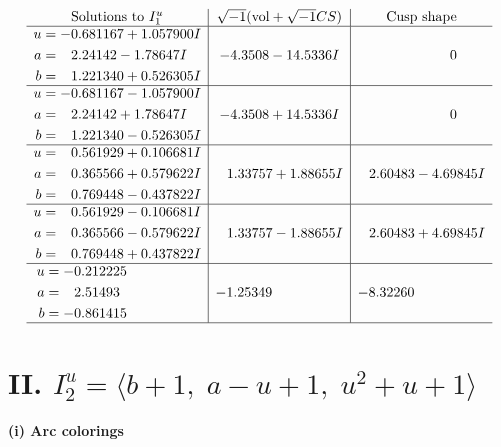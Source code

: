 \documentclass[1p]{elsarticle_modified}
\theoremstyle{definition}
\newcommand{\I}{\sqrt{-1}}
\begin{document}
$$\begin{array}{c|c|c}
\text{Solutions to }I^u_{1}& \I (\text{vol} + \sqrt{-1}CS) & \text{Cusp shape}\\
 \hline 
\begin{aligned}
u &= -0.681167 + 1.057900 I \\
a &= \phantom{-}2.24142 - 1.78647 I \\
b &= \phantom{-}1.221340 + 0.526305 I\end{aligned}
 & -4.3508 - 14.5336 I & \phantom{-0.000000 } 0 \\ \hline\begin{aligned}
u &= -0.681167 - 1.057900 I \\
a &= \phantom{-}2.24142 + 1.78647 I \\
b &= \phantom{-}1.221340 - 0.526305 I\end{aligned}
 & -4.3508 + 14.5336 I & \phantom{-0.000000 } 0 \\ \hline\begin{aligned}
u &= \phantom{-}0.561929 + 0.106681 I \\
a &= \phantom{-}0.365566 + 0.579622 I \\
b &= \phantom{-}0.769448 - 0.437822 I\end{aligned}
 & \phantom{-}1.33757 + 1.88655 I & \phantom{-}2.60483 - 4.69845 I \\ \hline\begin{aligned}
u &= \phantom{-}0.561929 - 0.106681 I \\
a &= \phantom{-}0.365566 - 0.579622 I \\
b &= \phantom{-}0.769448 + 0.437822 I\end{aligned}
 & \phantom{-}1.33757 - 1.88655 I & \phantom{-}2.60483 + 4.69845 I \\ \hline\begin{aligned}
u &= -0.212225\phantom{ +0.000000I} \\
a &= \phantom{-}2.51493\phantom{ +0.000000I} \\
b &= -0.861415\phantom{ +0.000000I}\end{aligned}
 & -1.25349\phantom{ +0.000000I} & -8.32260\phantom{ +0.000000I}\\
 \hline 
 \end{array}$$\newpage\newpage\renewcommand{\arraystretch}{1}
\centering \section*{II. $I^u_{2}= \langle b+1,\;a- u+1,\;u^2+u+1 \rangle$}
\flushleft \textbf{(i) Arc colorings}\\
\end{document}
